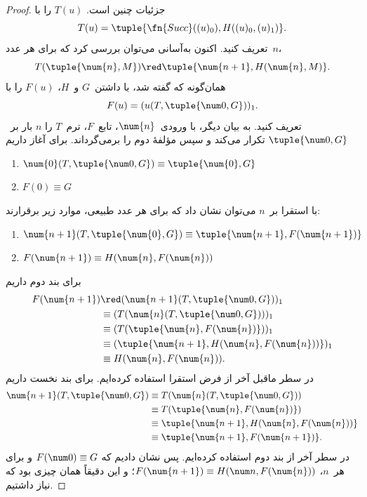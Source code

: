 \documentclass[../../../include/open-logic-section]{subfiles}
\begin{document}
\begin{proof}
جزئیات چنین است. $T(u)$ را با
\[
T(u) = \tuple{\fn{Succ}((u)_0), H((u)_0,(u)_1)}.
\]
تعریف کنید. اکنون به‌آسانی می‌توان بررسی کرد که برای هر عدد~$n$،
\[
T(\tuple{\num{n}, M}) \red \tuple{\num{n+1}, H(\num{n}, M)}.
\]
همان‌گونه که گفته شد، با داشتن~$G$ و~$H$، $F(u)$ را با
\[
F(u) = (u(T,\tuple{\num 0, G}))_1.
\]
تعریف کنید. به بیان دیگر، با ورودی~$\num{n}$، تابع~$F$، ترم~$T$ را
$n$ بار بر~$\tuple{\num 0, G}$ تکرار می‌کند و سپس مؤلفهٔ دوم را
برمی‌گرداند. برای آغاز داریم
\begin{enumerate}
\item $\num{0} (T, \tuple{\num 0, G}) \equiv \tuple{\num{0}, G}$
\item $F(\num{0}) \equiv G$
\end{enumerate}
با استقرا بر~$n$ می‌توان نشان داد که برای هر عدد طبیعی، موارد زیر برقرارند:
\begin{enumerate}
\item $\num{n+1}(T, \tuple{\num{0}, G}) \equiv \tuple{\num{n+1}, F(\num{n+1})}$
\item $F(\num{n+1}) \equiv H(\num{n}, F(\num{n}))$
\end{enumerate}
برای بند دوم داریم
\begin{align*}
F(\num{n+1}) & \red (\num{n+1}(T, \tuple{\num 0, G}))_1 \\
& \equiv (T(\num{n} (T, \tuple{\num 0, G})))_1 \\
& \equiv (T(\tuple{\num{n}, F(\num{n})}))_1 \\
& \equiv (\tuple{\num{n+1}, H(\num{n}, F(\num{n}))})_1 \\
& \equiv H(\num{n}, F(\num{n})).
\end{align*}
در سطر ماقبل آخر از فرض استقرا استفاده کرده‌ایم. برای بند نخست داریم
\begin{align*}
\num{n+1} (T, \tuple{\num 0, G}) &
\equiv T(\num{n} (T, \tuple{\num 0, G})) \\
& \equiv T( \tuple{\num{n}, F(\num{n})}) \\
& \equiv \tuple{\num{n+1}, H(\num{n}, F(\num{n}))} \\
& \equiv \tuple{\num{n+1}, F(\num{n+1})}.
\end{align*}
در سطر آخر از بند دوم استفاده کرده‌ایم. پس نشان دادیم که
$F(\num 0) \equiv G$ و برای هر~$n$، $F(\num {n+1}) \equiv H(\num
n, F(\num{n}))$؛ و این دقیقاً همان چیزی بود که نیاز داشتیم.
\end{proof}
\end{document}
